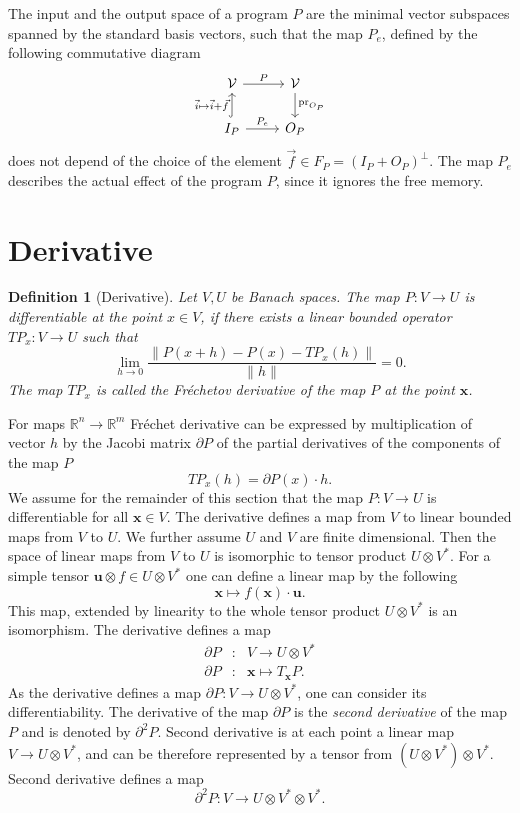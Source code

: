 \documentclass{article}
\newcommand{\RR}{\mathbb{R}}
\newcommand{\VV}{\mathcal{V}}
\newcommand{\x}{\mathbf{x}}
\newcommand{\uu}{\mathbf{u}}
\newcommand{\D}{\partial}
\newtheorem{definicija}{Definition}[section]
\begin{document}
The input and the output space of a program $P$ are the minimal
vector subspaces spanned by the standard basis vectors, such that the map $P_e$, 
defined by the following commutative diagram 
\begin{equation} 
    \label{eq:induced_map}
\begin{tikzcd}
  \VV \arrow{r}{P} & 
  \VV \arrow{d}{\mathrm{pr}_{O_P}}\\
  I_P \arrow[hook]{u}{\vec{i}\mapsto \vec{i}+\vec{f}} 
  \arrow{r}{P_e}& O_P
\end{tikzcd}
  \end{equation}
does not depend of the choice of the element 
$\vec{f}\in F_P=(I_P+O_P)^\perp$. The map $P_e$ describes the actual effect of the
program $P$, since it ignores the free memory. 
\section{Derivative}
\begin{definicija}[Derivative]
  Let $V,U$ be Banach spaces. The map $P:V\to U$ is differentiable at the point
  $x\in V$, if there exists a linear bounded operator $TP_x:V\to U$ such that
  \begin{equation}
    \label{eq:frechet}
    \lim_{h\to 0}\frac{\|P(x+h)-P(x)-TP_x(h)\|}{\|h\|} = 0.
  \end{equation}
  The map $TP_x$ is called the \emph{Fréchetov derivative} of the map $P$ at the
  point $\x$.
\end{definicija}
For maps $\RR^n\to \RR^m$ Fréchet derivative can be expressed by multiplication
of vector $h$ by the Jacobi matrix $\D P$ of the  partial derivatives of the 
components of the map $P$
\begin{equation*}
  TP_x(h) = \D P(x)\cdot h.
\end{equation*}
We assume for the remainder of this section that the map $P:V\to U$ is
differentiable for all $\x\in V$. The derivative defines a map from $V$ to
linear bounded maps from $V$ to $U$. We further assume $U$ and $V$ are finite
dimensional. Then the space of linear maps from $V$ to $U$ is isomorphic to
tensor product $U\otimes V^*$. For a simple tensor $\uu\otimes f\in U\otimes
V^*$ one can define a linear map by the following
 \begin{equation}
   \label{eq:lin_tenzor}
   \x \mapsto f(\x)\cdot \uu.
 \end{equation}
This map, extended by linearity to the whole tensor product $U\otimes V^*$ is an
isomorphism. The derivative defines a map
\begin{eqnarray}
  \label{eq:odvod_preslikava}
  \D P&:& V\to U\otimes V^*\\
  \D P&:& \x \mapsto T_\x P.
\end{eqnarray}
As the derivative defines a map $\D P:V\to U\otimes V^*$, one can consider its
differentiability. The derivative of the map $\D P$ is the \emph{second derivative}
of the map $P$ and is denoted by $\D^2P$. Second derivative is at each point a
linear map  $V\to U\otimes V^*$, and can be therefore 
represented by a tensor from $(U\otimes V^*)\otimes V^*$. Second derivative
defines a map 
$$\D^2 P:V\to U\otimes V^*\otimes V^*.$$ 
\end{document}
